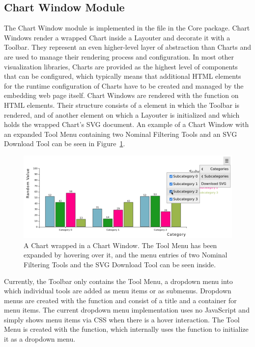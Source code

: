 \subsection{Chart Window Module}

The Chart Window module is implemented in the 
file in the Core package. Chart Windows render a wrapped
Chart inside a Layouter and decorate it with a Toolbar. They
represent an even higher-level layer of abstraction than Charts and
are used to manage their rendering process and configuration. In most
other visualization libraries, Charts are provided as the highest
level of components that can be configured, which typically means that
additional HTML elements for the runtime configuration of Charts have
to be created and managed by the embedding web page itself. Chart
Windows are rendered with the  function on
HTML  elements. Their structure consists of a
 element in which the Toolbar is rendered, and of
another  element on which a Layouter is
initialized and which holds the wrapped Chart's SVG document. An
example of a Chart Window with an expanded Tool Menu containing two
Nominal Filtering Tools and an SVG Download Tool can be seen in
Figure~\ref{fig:ChartWindow}.


\begin{figure}[tp]
\centering
\includegraphics[keepaspectratio,width=\linewidth,height=\fullh]
{images/chart-window.png}
\caption[Chart Window Example]{%
A Chart wrapped in a Chart Window. The Tool
Menu has been expanded by hovering over it, and the menu entries of
two Nominal Filtering Tools and the SVG Download Tool can be seen
inside. 
}
\label{fig:ChartWindow}
\end{figure}


Currently, the Toolbar only contains the Tool Menu, a dropdown menu
into which individual tools are added as menu items or as submenus.
Dropdown menus are created with the  function
and consist of a title and a container for menu items. The current
dropdown menu implementation uses no JavaScript and simply shows menu
items via CSS when there is a hover interaction. The Tool Menu is
created with the  function, which internally
uses the  function to initialize it as a
dropdown menu.


